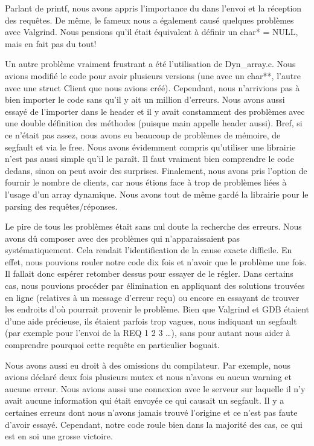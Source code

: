 \documentclass[11pt]{article}
\begin{document}
Parlant de printf, nous avons appris l’importance du \n dans l’envoi et la réception des requêtes. De même, le fameux \0 nous a également causé quelques problèmes avec Valgrind. Nous pensions qu’il était équivalent à définir un char* = NULL, mais en fait pas du tout!

Un autre problème vraiment frustrant a été l’utilisation de Dyn_array.c. Nous avions modifié le code pour avoir plusieurs versions (une avec un char**, l’autre avec une struct Client que nous avions créé). Cependant, nous n’arrivions pas à bien importer le code sans qu’il y ait un million d’erreurs. Nous avons aussi essayé de l’importer dans le header et il y avait constamment des problèmes avec une double définition des méthodes (puisque main appelle header aussi). Bref, si ce n’était pas assez, nous avons eu beaucoup de problèmes de mémoire, de segfault et via le free. Nous avons évidemment compris qu’utiliser une librairie n’est pas aussi simple qu’il le paraît. Il faut vraiment bien comprendre le code dedans, sinon on peut avoir des surprises. Finalement, nous avons pris l’option de fournir le nombre de clients, car nous étions face à trop de problèmes liées à l’usage d’un array dynamique. Nous avons tout de même gardé la librairie pour le parsing des requêtes/réponses.

Le pire de tous les problèmes était sans nul doute la recherche des erreurs. Nous avons dû composer avec des problèmes qui n'apparaissaient pas systématiquement. Cela rendait l'identification de la cause exacte difficile. En effet, nous pouvions rouler notre code dix fois et n’avoir que le problème une fois. Il fallait donc espérer retomber dessus pour essayer de le régler. Dans certains cas, nous pouvions procéder par élimination en appliquant des solutions trouvées en ligne (relatives à un message d’erreur reçu) ou encore en essayant de trouver les endroits d’où pourrait provenir le problème. Bien que Valgrind et GDB étaient d'une aide précieuse, ils étaient parfois trop vagues, nous indiquant un segfault (par exemple pour l’envoi de la REQ 1 2 3 …), sans pour autant nous aider à comprendre pourquoi cette requête en particulier boguait. 

Nous avons aussi eu droit à des omissions du compilateur. Par exemple, nous avions déclaré deux fois plusieurs mutex et nous n'avons eu aucun warning et aucune erreur. Nous avions aussi une connexion avec le serveur sur laquelle il n'y avait aucune information qui était envoyée ce qui causait un segfault. Il y a certaines erreurs dont nous n'avons jamais trouvé l'origine et ce n'est pas faute d'avoir essayé. Cependant, notre code roule bien dans la majorité des cas, ce qui est en soi une grosse victoire. 
\end{document}
